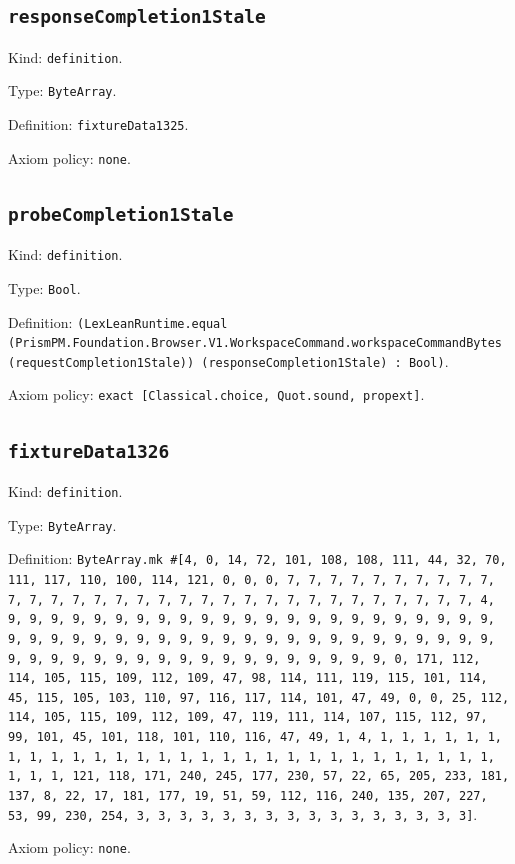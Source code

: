 \documentclass[11pt]{article}
\begin{document}
\subsection*{\texttt{responseCompletion1Stale}}
\noindent Kind: \texttt{definition}.\par
\noindent Type: \texttt{ByteArray}.\par
\noindent Definition: \texttt{fixtureData1325}.\par
\noindent Axiom policy: \texttt{none}.\par
\subsection*{\texttt{probeCompletion1Stale}}
\noindent Kind: \texttt{definition}.\par
\noindent Type: \texttt{Bool}.\par
\noindent Definition: \texttt{(LexLeanRuntime.equal (PrismPM.Foundation.Browser.V1.WorkspaceCommand.workspaceCommandBytes (requestCompletion1Stale)) (responseCompletion1Stale) : Bool)}.\par
\noindent Axiom policy: \texttt{exact [Classical.choice, Quot.sound, propext]}.\par
\subsection*{\texttt{fixtureData1326}}
\noindent Kind: \texttt{definition}.\par
\noindent Type: \texttt{ByteArray}.\par
\noindent Definition: \texttt{ByteArray.mk \#[4, 0, 14, 72, 101, 108, 108, 111, 44, 32, 70, 111, 117, 110, 100, 114, 121, 0, 0, 0, 7, 7, 7, 7, 7, 7, 7, 7, 7, 7, 7, 7, 7, 7, 7, 7, 7, 7, 7, 7, 7, 7, 7, 7, 7, 7, 7, 7, 7, 7, 7, 7, 4, 9, 9, 9, 9, 9, 9, 9, 9, 9, 9, 9, 9, 9, 9, 9, 9, 9, 9, 9, 9, 9, 9, 9, 9, 9, 9, 9, 9, 9, 9, 9, 9, 9, 9, 9, 9, 9, 9, 9, 9, 9, 9, 9, 9, 9, 9, 9, 9, 9, 9, 9, 9, 9, 9, 9, 9, 9, 9, 9, 9, 9, 9, 9, 9, 0, 171, 112, 114, 105, 115, 109, 112, 109, 47, 98, 114, 111, 119, 115, 101, 114, 45, 115, 105, 103, 110, 97, 116, 117, 114, 101, 47, 49, 0, 0, 25, 112, 114, 105, 115, 109, 112, 109, 47, 119, 111, 114, 107, 115, 112, 97, 99, 101, 45, 101, 118, 101, 110, 116, 47, 49, 1, 4, 1, 1, 1, 1, 1, 1, 1, 1, 1, 1, 1, 1, 1, 1, 1, 1, 1, 1, 1, 1, 1, 1, 1, 1, 1, 1, 1, 1, 1, 1, 1, 1, 121, 118, 171, 240, 245, 177, 230, 57, 22, 65, 205, 233, 181, 137, 8, 22, 17, 181, 177, 19, 51, 59, 112, 116, 240, 135, 207, 227, 53, 99, 230, 254, 3, 3, 3, 3, 3, 3, 3, 3, 3, 3, 3, 3, 3, 3, 3, 3]}.\par
\noindent Axiom policy: \texttt{none}.\par
\end{document}
